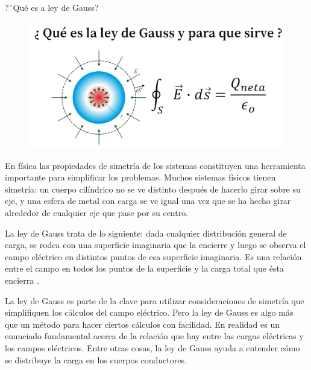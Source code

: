 \newpage %
\begin{myblock}{?´Qué es a ley de Gauss?}

\begin{figure}[H]
	\centering
	\includegraphics[width=.9\textwidth]{imagenes/imagenes23/T23IM13.png}
\end{figure}

\vspace{2mm} En física las propiedades de simetría de los sistemas constituyen una herramienta importante para simplificar los problemas. Muchos sistemas físicos tienen simetría: un cuerpo cilíndrico no se ve distinto después de hacerlo girar sobre su eje, y una esfera de metal con carga se ve igual una vez que se ha hecho girar alrededor de cualquier eje que pase por su centro. 

\vspace{2mm} La ley de Gauss trata de lo siguiente: dada cualquier distribución general de carga, se rodea con una superficie imaginaria que la encierre y luego se observa el campo eléctrico en distintos puntos de esa superficie imaginaria. Es una relación entre el campo en todos los puntos de la superficie y la carga total que ésta encierra .

\vspace{2mm} La ley de Gauss es parte de la clave para utilizar consideraciones de simetría que simplifiquen los cálculos del campo eléctrico. Pero la ley de Gauss es algo más que un método para hacer ciertos cálculos con facilidad. En realidad es un enunciado fundamental acerca de la relación que hay entre las cargas eléctricas y los campos eléctricos. Entre otras cosas, la ley de Gauss ayuda a entender cómo se distribuye la carga en los cuerpos conductores. 
\end{myblock}